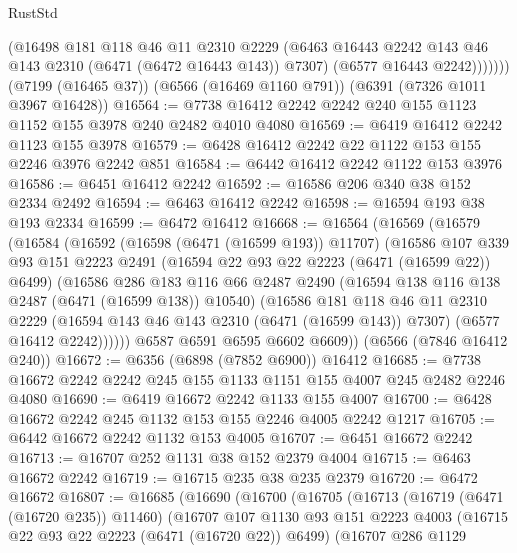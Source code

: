 \begin{lexlean}{RustStd}
\begin{coremodule}
              (@16498
                @181
                @118
                @46
                @11
                @2310
                @2229
                (@6463 @16443 @2242 @143 @46 @143 @2310 (@6471 (@6472 @16443 @143)) @7307)
                (@6577 @16443 @2242)))))))
    (@7199 (@16465 @37))
    (@6566 (@16469 @1160 @791))
    (@6391 (@7326 @1011 @3967 @16428))
@16564 := @7738 @16412 @2242 @2242 @240 @155 @1123 @1152 @155 @3978 @240 @2482 @4010 @4080
@16569 := @6419 @16412 @2242 @1123 @155 @3978
@16579 := @6428 @16412 @2242 @22 @1122 @153 @155 @2246 @3976 @2242 @851
@16584 := @6442 @16412 @2242 @1122 @153 @3976
@16586 := @6451 @16412 @2242
@16592 := @16586 @206 @340 @38 @152 @2334 @2492
@16594 := @6463 @16412 @2242
@16598 := @16594 @193 @38 @193 @2334
@16599 := @6472 @16412
@16668 := @16564
    (@16569
      (@16579
        (@16584
          (@16592
            (@16598 (@6471 (@16599 @193)) @11707)
            (@16586
              @107
              @339
              @93
              @151
              @2223
              @2491
              (@16594 @22 @93 @22 @2223 (@6471 (@16599 @22)) @6499)
              (@16586
                @286
                @183
                @116
                @66
                @2487
                @2490
                (@16594 @138 @116 @138 @2487 (@6471 (@16599 @138)) @10540)
                (@16586
                  @181
                  @118
                  @46
                  @11
                  @2310
                  @2229
                  (@16594 @143 @46 @143 @2310 (@6471 (@16599 @143)) @7307)
                  (@6577 @16412 @2242))))))
        @6587
        @6591
        @6595
        @6602
        @6609))
    (@6566 (@7846 @16412 @240))
@16672 := @6356 (@6898 (@7852 @6900)) @16412
@16685 := @7738 @16672 @2242 @2242 @245 @155 @1133 @1151 @155 @4007 @245 @2482 @2246 @4080
@16690 := @6419 @16672 @2242 @1133 @155 @4007
@16700 := @6428 @16672 @2242 @245 @1132 @153 @155 @2246 @4005 @2242 @1217
@16705 := @6442 @16672 @2242 @1132 @153 @4005
@16707 := @6451 @16672 @2242
@16713 := @16707 @252 @1131 @38 @152 @2379 @4004
@16715 := @6463 @16672 @2242
@16719 := @16715 @235 @38 @235 @2379
@16720 := @6472 @16672
@16807 := @16685
    (@16690
      (@16700
        (@16705
          (@16713
            (@16719 (@6471 (@16720 @235)) @11460)
            (@16707
              @107
              @1130
              @93
              @151
              @2223
              @4003
              (@16715 @22 @93 @22 @2223 (@6471 (@16720 @22)) @6499)
              (@16707
                @286
                @1129

\end{coremodule}
\end{lexlean}
